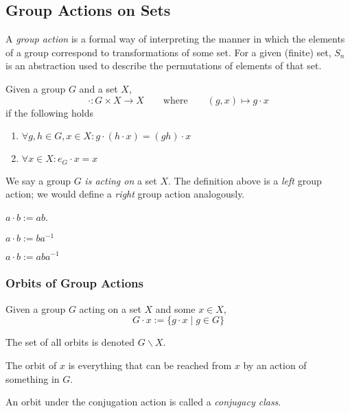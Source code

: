 \subsection{Group Actions on Sets}
A \emph{group action} is a formal way of interpreting the manner in which the elements of a group correspond to transformations of some set.
For a given (finite) set, \(S_n\) is an abstraction used to describe the permutations of elements of that set.

\begin{definition}
   Given a group \(G\) and a set \(X\),
   \[\cdot: G \times X \to X \qquad\text{where}\qquad (g, x) \mapsto g \cdot x\]
   if the following holds
   \begin{enumerate}[label=\roman*, align=Center]
      \item \(\forall g, h \in G, x \in X: g \cdot (h \cdot x) = (gh) \cdot x\)
      \item \(\forall x \in X: e_G \cdot x = x\)
   \end{enumerate}
\end{definition}
\begin{remark}
   We say a group \(G\) \emph{is acting on} a set \(X\).
   The definition above is a \emph{left} group action; we would define a \emph{right} group action analogously.
\end{remark}
\begin{example}
   \(a \cdot b := ab\).
\end{example}
\begin{example}
   \(a \cdot b := ba^{-1}\)
\end{example}
\begin{example}[Conjugation]
   \(a \cdot b := aba^{-1}\)
\end{example}

\subsubsection{Orbits of Group Actions}
\begin{definition}[Orbit]
   Given a group \(G\) acting on a set \(X\) and some \(x \in X\),
   \[G \cdot x := \{g \cdot x \mid g \in G\}\]
\end{definition}
\begin{remark}[Notation]
   The set of all orbits is denoted \(G\backslash X\).
\end{remark}
\begin{remark}[Intuition]
   The orbit of \(x\) is everything that can be reached from \(x\) by an action of something in \(G\).
\end{remark}
\begin{remark}
   An orbit under the conjugation action is called a \emph{conjugacy class}.
\end{remark}

